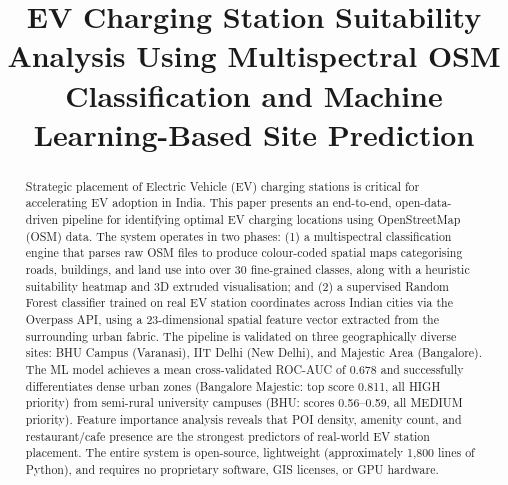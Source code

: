 \documentclass[conference]{IEEEtran}
\begin{document}
\title{EV Charging Station Suitability Analysis Using Multispectral OSM Classification and Machine Learning-Based Site Prediction}

\author{
\and
{}
}

\maketitle

\begin{abstract}
Strategic placement of Electric Vehicle (EV) charging stations is critical for accelerating EV adoption in India. This paper presents an end-to-end, open-data-driven pipeline for identifying optimal EV charging locations using OpenStreetMap (OSM) data. The system operates in two phases: (1) a multispectral classification engine that parses raw OSM files to produce colour-coded spatial maps categorising roads, buildings, and land use into over 30 fine-grained classes, along with a heuristic suitability heatmap and 3D extruded visualisation; and (2) a supervised Random Forest classifier trained on real EV station coordinates across Indian cities via the Overpass API, using a 23-dimensional spatial feature vector extracted from the surrounding urban fabric. The pipeline is validated on three geographically diverse sites: BHU Campus (Varanasi), IIT Delhi (New Delhi), and Majestic Area (Bangalore). The ML model achieves a mean cross-validated ROC-AUC of 0.678 and successfully differentiates dense urban zones (Bangalore Majestic: top score 0.811, all HIGH priority) from semi-rural university campuses (BHU: scores 0.56--0.59, all MEDIUM priority). Feature importance analysis reveals that POI density, amenity count, and restaurant/cafe presence are the strongest predictors of real-world EV station placement. The entire system is open-source, lightweight (approximately 1,800 lines of Python), and requires no proprietary software, GIS licenses, or GPU hardware.
\end{abstract}
\end{document}
